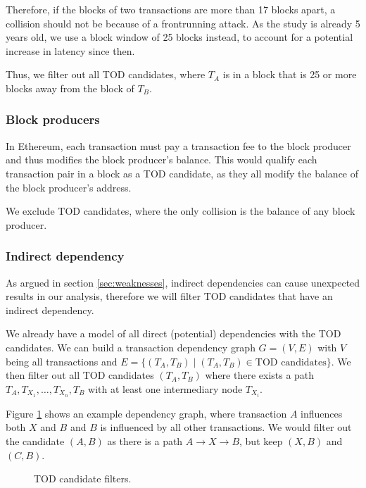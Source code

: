 \documentclass[draft,final]{vutinfth} %
\begin{document}
Therefore, if the blocks of two transactions are more than 17 blocks apart, a collision should not be because of a frontrunning attack. As the study is already 5 years old, we use a block window of 25 blocks instead, to account for a potential increase in latency since then.

Thus, we filter out all TOD candidates, where $T_A$ is in a block that is 25 or more blocks away from the block of $T_B$.

\subsubsection{Block producers}

In Ethereum, each transaction must pay a transaction fee to the block producer and thus modifies the block producer's balance. This would qualify each transaction pair in a block as a TOD candidate, as they all modify the balance of the block producer's address.

We exclude TOD candidates, where the only collision is the balance of any block producer.

\subsubsection{Indirect dependency}

As argued in section \ref{sec:weaknesses}, indirect dependencies can cause unexpected results in our analysis, therefore we will filter TOD candidates that have an indirect dependency.

We already have a model of all direct (potential) dependencies with the TOD candidates. We can build a transaction dependency graph $G = (V, E)$ with $V$ being all transactions and $E = \{ (T_A, T_B) \mid (T_A, T_B) \in \text{TOD candidates} \}$. We then filter out all TOD candidates $(T_A, T_B)$ where there exists a path $T_A, T_{X_1}, \dots, T_{X_n}, T_B$ with at least one intermediary node $T_{X_i}$.

Figure \ref{fig:tod_candidate_dependency} shows an example dependency graph, where transaction $A$ influences both $X$ and $B$ and $B$ is influenced by all other transactions. We would filter out the candidate $(A, B)$ as there is a path $A \rightarrow X \rightarrow B$, but keep $(X, B)$ and $(C, B)$.

\begin{figure}[h]
    \centering
    \caption{TOD candidate filters.}
    \label{fig:tod_candidate_dependency}
\end{figure}
\end{document}
